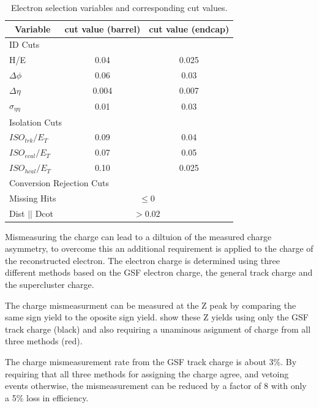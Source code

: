 \begin{table}[htbp]
  \begin{center}
    \leavevmode
    \begin{tabular}{lcc} 
      \multicolumn{1}{c}{Variable} & \multicolumn{1}{c}{cut value (barrel)}& \multicolumn{1}{c}{cut value (endcap)}\\
      \hline
      \multicolumn{3}{l}{ID Cuts}\\ 
        H/E & 0.04 & 0.025 \\
        $\Delta\phi$ & 0.06 & 0.03 \\
        $\Delta\eta$ & 0.004 & 0.007  \\
        $\sigma_{\eta\eta}$ & 0.01 & 0.03 \\ \hline
      \multicolumn{3}{l}{Isolation Cuts}\\
        $ISO_{trk} / E_T $  & 0.09 & 0.04 \\
        $ISO_{ecal}/ E_T$  & 0.07 & 0.05 \\
        $ISO_{hcal}/ E_T$  & 0.10 & 0.025 \\ \hline
       \multicolumn{3}{l}{Conversion Rejection Cuts}\\ 
        Missing Hits  & \multicolumn{2}{c|}{$\leq 0$}\\
        Dist $||$ Dcot   & \multicolumn{2}{c|}{$>0.02$}\\
    \end{tabular}
    \caption{\label{tab:elecuts} Electron selection variables and corresponding cut values.}
  \end{center}
\end{table}


Mismeasuring the charge can lead to a diltuion of the measured charge asymmetry,
to overcome this an additional requirement is applied to the charge of the
reconstructed electron. 
The electron charge is determined using three different methods based on the GSF
electron charge, the general track charge and the supercluster charge.

The charge mismeasurment can be measured at the Z peak by comparing the same
sign \HepProcess{\PZ\to\Pepm\Pepm} yield to the oposite sign
\HepProcess{\PZ\to\Pepm\Pemp} yield.  show these Z yields
using only the \ac{GSF} track charge (black) and also requiring a unaminous
asignment of charge from all three methods (red). 


The charge mismeasurement rate from the GSF track charge is about \unit{3}{\%}.
By requiring that all three methods for assigning the charge agree, and vetoing
events otherwise, the mismeasurement can be reduced by a factor of 8 with only a
\unit{5}{\%} loss in efficiency.

